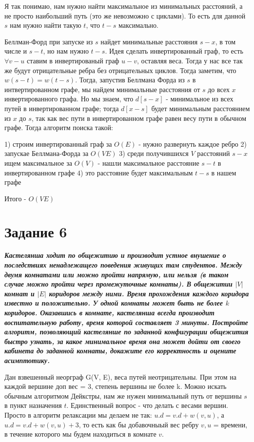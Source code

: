 \documentclass{article}
\begin{document}
Я так понимаю, нам нужно найти максимальное из минимальных расстояний, а не просто наибольший путь (это же невозможно с циклами). То есть для данной $s$ нам нужно найти такую $t$, что $t-s$ максимально.

Беллман-Форд при запуске из $s$ найдет минимальные расстояния $s-x$, в том числе и $s-t$, но нам нужно $t-s$. Идея сделать инвертированный граф, то есть $\forall v-u$ ставим в инвертированый граф $u-v$, оставляя веса. Тогда у нас все так же будут отрицательные ребра без отрицательных циклов. Тогда заметим, что $w(s-t) = w(t-s)$. Тогда, запустив Беллмана Форда из $s$ в интвертированном графе, мы найдем минимальные расстояния от $s$ до всех $x$ инвертированного графа. Но мы знаем, что $d[s-x]$ - минимальное из всех путей в инвертированном графе; тогда $d[x-s]$ будет минимальным расстоянием из $x$ до $s$, так как вес пути в инвертированном графе равен весу пути в обычном графе. Тогда алгоритм поиска такой:

1) строим инвертированный граф за $O(E)$ - нужно развернуть каждое ребро
2) запускае Беллмана-Форда за $O(VE)$
3) среди получившихся $V$ расстояний $s-x$ ищем максимальное за $O(V)$ - нашли максимальное расстояние $s-t$ в инвертированном графе
4) это расстояние будет максимальным $t-s$ в нашем графе

Итого - $O(VE)$

\bigskip

\section*{\textbf{Задание 6}} \textbf{\textit{Кастелянша ходит по общежитию и производит устное внушение о последствиях ненадлежащего поведения живущих там студентов. Между двумя комнатами или можно пройти напрямую, или нельзя (в таком случае можно пройти через промежуточные комнаты). В общежитии $|V|$ комнат и $|E|$ коридоров между ними. Время прохождения каждого коридора известно и положительно. У одной комнаты может быть не более $k$ коридоров. Оказавшись в комнате, кастелянша всегда производит воспитательную работу, время которой составляет 3 минуты. Постройте алгоритм, позволяющий кастелянше по заданной конфигурации общежития быстро узнать, за какое минимальное время она может дойти от своего кабинета до заданной комнаты, докажите его корректность и оцените асимптотику.}}

Дан взвешенный неорграф G(V, E), веса путей неотрицательны. При этом на каждой вершине доп вес = 3, степень вершины не более k. 
Можно искать обычным алгоритмом Дейкстры, нам же нужен минимальный путь от вершины $s$ в пункт назначения $t$. Единственный вопрос - что делать с весами вершин. Просто в алгоритм релаксации мы делаем не так: $u.d = v.d + w(v, u)$, а  $u.d = v.d + w(v, u) + 3$, то есть как бы добавочныый вес ребру $v, u$ = времени, в течение которого мы будем находиться в комнате $v$. 
\end{document}
